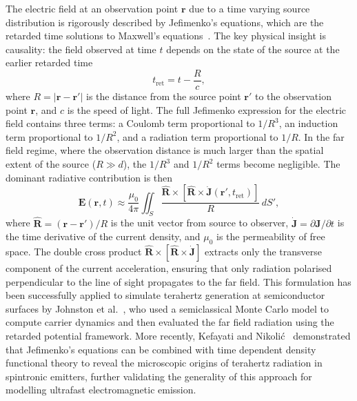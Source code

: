 \documentclass[12pt]{final_project_report}
\begin{document}
The electric field at an observation point $\mathbf{r}$ due to a time varying source distribution is rigorously described by Jefimenko's equations, which are the retarded time solutions to Maxwell's equations~\cite{griffiths_electrodynamics}. The key physical insight is causality: the field observed at time $t$ depends on the state of the source at the earlier retarded time
\begin{equation}
    t_{\mathrm{ret}} = t - \frac{R}{c},
\end{equation}
where $R = |\mathbf{r} - \mathbf{r}'|$ is the distance from the source point $\mathbf{r}'$ to the observation point $\mathbf{r}$, and $c$ is the speed of light. The full Jefimenko expression for the electric field contains three terms: a Coulomb term proportional to $1/R^3$, an induction term proportional to $1/R^2$, and a radiation term proportional to $1/R$. In the far field regime, where the observation distance is much larger than the spatial extent of the source ($R \gg d$), the $1/R^3$ and $1/R^2$ terms become negligible. The dominant radiative contribution is then
\begin{equation}
    \mathbf{E}(\mathbf{r}, t) \approx \frac{\mu_0}{4\pi} \iint_{S} \frac{\hat{\mathbf{R}} \times \left[\hat{\mathbf{R}} \times \dot{\mathbf{J}}(\mathbf{r}', t_{\mathrm{ret}})\right]}{R} \, dS',
    \label{eq:farfield}
\end{equation}
where $\hat{\mathbf{R}} = (\mathbf{r} - \mathbf{r}')/R$ is the unit vector from source to observer, $\dot{\mathbf{J}} = \partial \mathbf{J}/\partial t$ is the time derivative of the current density, and $\mu_0$ is the permeability of free space. The double cross product $\hat{\mathbf{R}} \times [\hat{\mathbf{R}} \times \dot{\mathbf{J}}]$ extracts only the transverse component of the current acceleration, ensuring that only radiation polarised perpendicular to the line of sight propagates to the far field. This formulation has been successfully applied to simulate terahertz generation at semiconductor surfaces by Johnston et al.~\cite{SimulationTHz}, who used a semiclassical Monte Carlo model to compute carrier dynamics and then evaluated the far field radiation using the retarded potential framework. More recently, Kefayati and Nikoli\'{c}~\cite{Kefayati2024} demonstrated that Jefimenko's equations can be combined with time dependent density functional theory to reveal the microscopic origins of terahertz radiation in spintronic emitters, further validating the generality of this approach for modelling ultrafast electromagnetic emission.
\end{document}
